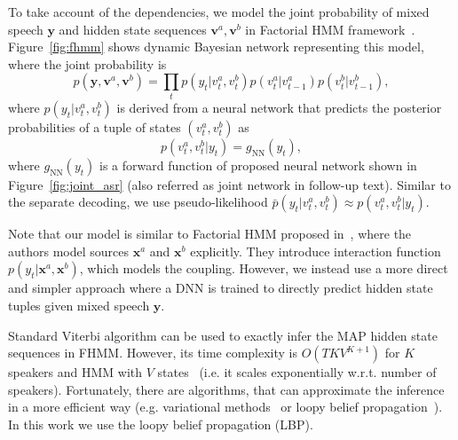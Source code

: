 \documentclass[a4paper]{article}
\newcommand{\spkrA}{a}
\newcommand{\spkrB}{b}
\def\x{{\mathbf x}}
\def\y{{\mathbf y}}
\def\w{{\mathbf v}}
\def\p{{\bar p}}
\DeclareMathOperator*{\dnn}{NN}
\begin{document}
To take account of the dependencies, we model the joint probability of mixed speech $\y$ and hidden state sequences $\w^{\spkrA}, \w^{\spkrB}$ in Factorial HMM framework~\cite{Ghahramani1997}.
Figure~\ref{fig:fhmm} shows dynamic Bayesian network representing this model, where
the joint probability is
\begin{equation}
    p(\y, \w^{\spkrA}, \w^{\spkrB}) = \prod_t p(y_t | v_t^{\spkrA}, v_t^{\spkrB}) p(v_t^{\spkrA}|v_{t-1}^{\spkrA}) p(v_t^{\spkrB}|v_{t-1}^{\spkrB}),
\end{equation}
where $ p(y_t | v_t^{\spkrA}, v_t^{\spkrB}) $ is derived from a neural network that predicts the posterior probabilities of a tuple of states $(v_t^{\spkrA}, v_t^{\spkrB})$ as  
\begin{equation}
    p(v_t^{\spkrA}, v_t^{\spkrB} | y_t) = g_{\dnn}(y_t),
\end{equation}
where $g_{\dnn}(y_t)$ is a forward function of proposed neural network shown in Figure~\ref{fig:joint_asr} (also referred as joint network in follow-up text).
Similar to the separate decoding, we use pseudo-likelihood $\p(y_t | v_t^{\spkrA}, v_t^{\spkrB}) \approx p(v_t^{\spkrA}, v_t^{\spkrB} | y_t)$.

Note that our model is similar to Factorial HMM proposed in~\cite{Rennie2010}, where the authors model sources $\x^\spkrA$ and $\x^\spkrB$ explicitly. They introduce  interaction function $p(y_t | \x^\spkrA, \x^\spkrB)$, which models the coupling. However, we instead use a more direct and simpler approach where a DNN is trained to directly predict hidden state tuples given mixed speech $\y$.

Standard Viterbi algorithm can be used to exactly infer the MAP hidden state sequences in FHMM. However, its time complexity is $O(TKV^{K+1})$ for $K$ speakers and HMM with $V$ states~\cite{Rennie2010} (i.e. it scales exponentially w.r.t. number of speakers).
Fortunately, there are algorithms, that can approximate the inference in a more efficient way (e.g. variational methods~\cite{Ghahramani1997} or loopy belief propagation~\cite{Rennie2010}). In this work we use the loopy belief propagation (LBP).
\end{document}
